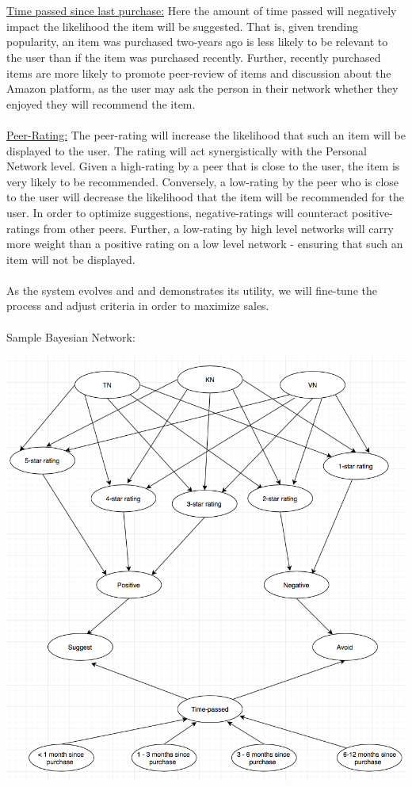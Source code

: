 \documentclass[12pt,a4paper]{article}
\begin{document}
		\\\\
		\underline{Time passed since last purchase:} Here the amount of time passed will negatively impact the likelihood the item will be suggested. That is, given trending popularity, an item was purchased two-years ago is less likely to be relevant to the user than if the item was purchased recently. Further, recently purchased items are more likely to promote peer-review of items and discussion about the Amazon platform, as the user may ask the person in their network whether they enjoyed they will recommend the item. 
		\\\\
		\underline{Peer-Rating:} The peer-rating will increase the likelihood that such an item will be displayed to the user. The rating will act synergistically with the Personal Network level. Given a high-rating by a peer that is close to the user, the item is very likely to be recommended. Conversely, a low-rating by the peer who is close to the user will decrease the likelihood that the item will be recommended for the user. In order to optimize suggestions, negative-ratings will counteract positive-ratings from other peers. Further, a low-rating by high level networks will carry more weight than a positive rating on a low level network - ensuring that such an item will not be displayed. 
		\\\\
		As the system evolves and and demonstrates its utility, we will fine-tune the process and adjust criteria in order to maximize sales. 
		\\\\
		Sample Bayesian Network:
		\begin{center}
			\includegraphics[width=1\linewidth]{bayes}
		\end{center}
		
\end{document}
